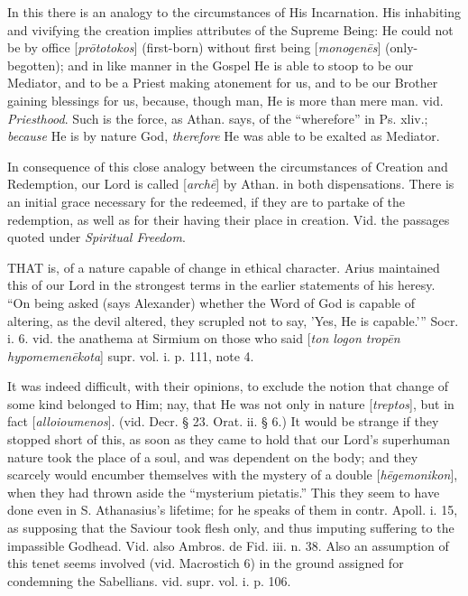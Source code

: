 In this there is an analogy to the circumstances
of His Incarnation. His inhabiting and vivifying the creation implies
attributes of the Supreme Being: He could not be by office [\emph{pr\={o}totokos}]
(first-born) without first being [\emph{monogen\={e}s}]
(only-begotten); and in like manner in the Gospel He is able to stoop
to be our Mediator, and to be a Priest making atonement for us, and to
be our Brother gaining blessings for us, because, though man, He is
more than mere man. vid. \emph{Priesthood}. Such is the force, as
Athan. says, of the “wherefore” in Ps. xliv.; \emph{because}
He is by nature God, \emph{therefore} He was able to be exalted as
Mediator.

In consequence of this close analogy between the
circumstances of Creation and Redemption, our Lord is called [\emph{arch\={e}}]
by Athan. in both dispensations. There is an initial grace necessary
for the redeemed, if they are to partake of the redemption, as well as
for their having their place in creation. Vid. the passages quoted
under \emph{Spiritual Freedom}.


THAT
is, of a nature capable of change in ethical character. Arius
maintained this of our Lord in the strongest terms in the earlier
statements of his heresy. “On being asked (says Alexander) whether
the Word of God is capable of altering, as the devil altered, they
scrupled not to say, 'Yes, He is capable.'” Socr. i. 6. vid. the
anathema at Sirmium on those who said [\emph{ton logon trop\={e}n
hypomemen\={e}kota}] supr. vol. i. p. 111, note 4.

It was indeed difficult, with their opinions, to
exclude the notion that change of some kind belonged to Him; nay, that
He was not only in nature [\emph{treptos}], but in fact [\emph{alloioumenos}].
(vid. Decr. § 23. Orat. ii. § 6.) It would be strange if they
stopped short of this, as soon as they came to hold that our Lord’s
superhuman nature took the place of a soul, and was dependent on the
body; and they scarcely would encumber themselves with the mystery of
a double [\emph{h\={e}gemonikon}], when they had thrown aside the
“mysterium pietatis.” This they seem to have done even in S.
Athanasius’s lifetime; for he speaks of them in contr. Apoll. i. 15,
as supposing that the Saviour took flesh only, and thus imputing
suffering to the impassible Godhead. Vid. also Ambros. de Fid. iii. n.
38. Also an assumption of this tenet seems involved (vid. Macrostich
6) in the ground assigned for condemning the Sabellians. vid.
supr. vol. i. p. 106.

